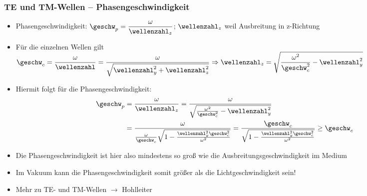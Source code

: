 \begin{frame}
  \frametitle{TE und TM-Wellen -- Phasengeschwindigkeit}
  \begin{itemize}[<+->]
  \item Phasengeschwindigkeit: \( \geschw_p = \dfrac{\omega}{\wellenzahl_z}\); \(\wellenzahl_z\) weil Ausbreitung in z-Richtung
  \item Für die einzelnen Wellen gilt \(\geschw_c = \dfrac{\omega}{\wellenzahl} = \dfrac{\omega}{\sqrt{\wellenzahl_y^2+\wellenzahl_z^2}} \Rightarrow \wellenzahl_z = \sqrt{\dfrac{\omega^2}{\geschw_c^2}-\wellenzahl_y^2 }\)
  \item Hiermit folgt für die Phasengeschwindigkeit:
    \begin{align*}
      \geschw_p & = \frac{\omega}{\wellenzahl_z} = \frac{\omega}{\sqrt{\frac{\omega^2}{\geschw_c^2}-\wellenzahl_y^2 }} \\
                & = \frac{\omega}{\frac{\omega}{\geschw_c}\sqrt{1-\frac{\wellenzahl_y^2 \geschw_c^2}{\omega^2} }} = \frac{\geschw_c}{\sqrt{1-\frac{\wellenzahl_y^2 \geschw_c^2}{\omega^2} }} \ge \geschw_c 
      \end{align*}
    \item Die Phasengeschwindigkeit ist hier also mindestens so groß wie die Ausbreitungsgeschwindigkeit im Medium
    \item Im Vakuum kann die Phasengeschwindigkeit somit \alert{größer als die Lichtgeschwindigkeit} sein!
      \item Mehr zu TE- und TM-Wellen \(\to\) \alert{Hohlleiter} 
    \end{itemize}
\end{frame}
  

   
